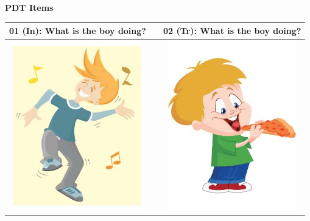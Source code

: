 \label{PDT-include}


{\large \textbf{PDT Items}}

\vspace{2em}

\begin{tabular}{|c|c|c|}
\hline
01 (In): What is the boy doing? && 02 (Tr): What is the boy doing? \\
\hline
\includegraphics[width=15em,trim=0 0 0 -3]{figures/I01.jpg} & & \includegraphics[width=15em,trim=0 0 0 -3]{figures/I02.jpg} \\
\hline
\end{tabular}
\vspace{1em} \\


